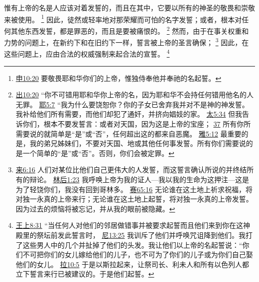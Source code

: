\documentclass[12pt, a4paper, oneside]{ctexart}
\newcounter{parnum}[section]
\newcommand{\N}{%
   \noindent\refstepcounter{parnum}%
    \makebox[\parindent][l]{\textbf{\arabic{parnum}.}}}
\begin{document}
\N 惟有上帝的名是人应该对着发誓的，而且在其中，它要以所有的神圣的敬畏和崇敬来被使用。
	\footnote {
		\href{https://biblehub.com/deuteronomy/6-13.htm}{申10:20} 要敬畏耶和华你们的上帝，惟独侍奉他并奉祂的名起誓。
	}
	因此，徒然或轻率地对那荣耀而可怕的名字发誓；或者，根本对任何其他东西发誓，都是罪恶的，而且是要被痛恨的。
	\footnote {
		\href{https://biblehub.com/exodus/20-7.htm}{出10:20} “你不可错用耶和华你上帝的名，因为耶和华不会持任何错用他名的人无罪。
		\href{https://biblehub.com/jeremiah/5-7.htm}{耶5:7} “我为什么要饶恕你？你的子女已舍弃我并对不是神的神发誓。我补给他们所有需要，而他们却犯了通奸，并挤向娼妓的家。
		\href{https://biblehub.com/matthew/5-34.htm}{太5:34} 但我告诉你们，根本不要发誓言：或者对天国，因为这是上帝的宝座；
		\href{https://biblehub.com/matthew/5-37.htm}{37} 所有你所需要说的就简单是“是”或“否”，任何超出这的都来自恶魔。
		\href{https://biblehub.com/james/5-12.htm}{雅5:12} 最重要的是，我的弟兄姊妹们，不要对天国、地或其他任何事发誓。所有你们需要说的是一个简单的“是”或“否”。否则，你们会被定罪。
	}
	然而，由于在事关权重和力势的问题上，在新约下和在旧约下一样，誓言被上帝的圣言确保；
	\footnote {
		\href{https://biblehub.com/hebrews/6-16.htm}{来6:16} 人们对某位比他们自己更伟大的人发誓，而这誓言确认所说的并终结所有的辩论。
		\href{https://biblehub.com/2_corinthians/1-23.htm}{林后1:23} 我呼唤上帝为我的证人---我以我的生命为这押注---这是为了轻饶你们，我没有回到哥林多。
		\href{https://biblehub.com/isaiah/65-16.htm}{赛65:16} 无论谁在这土地上祈求祝福，将对独一永真的上帝来行；无论谁在这土地上起誓，将对独一永真的上帝发誓。因为过去的烦恼将被忘记，并从我的眼前被隐藏。
	}
	因此，在这些问题上，应由合法的权威强制来起合法的宣誓。
	\footnote {
		\href{https://biblehub.com/1_kings/8-31.htm}{王上8:31} “当任何人对他们的邻居做错事并被要求起誓而且他们来到你在这神殿里的祭坛前发此誓言时，
		\href{https://biblehub.com/nehemiah/13-25.htm}{尼13:25} 我训斥了他们并呼唤咒诅降到他们。我打了这些男人中的几个并扯掉了他们的头发。我让他们以上帝的名起誓说：“你们不可把你们的女儿嫁给他们的儿子，也不可为了你们的儿子或为你们自己娶他们的女儿。
		\href{https://biblehub.com/ezra/10-5.htm}{拉10:5} 于是以斯拉起来，让祭司长、利未人和所有以色列人都立下誓言来行已被建议的。于是他们起誓。
	}
\end{document}
